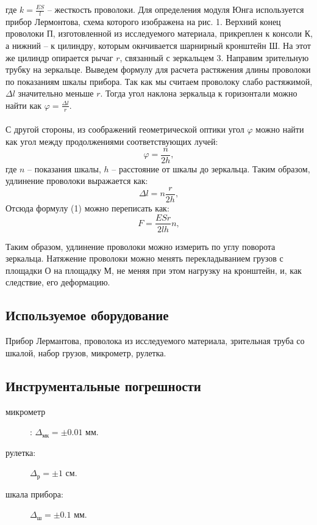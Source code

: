 \documentclass[a4paper]{article}
\begin{document}
\noindent где $k = \frac{ES}{l}$ – жесткость проволоки. Для определения модуля Юнга используется прибор Лермонтова, схема которого изображена на рис. 1. Верхний конец проволоки П, изготовленной из исследуемого материала, прикреплен к консоли К, а нижний – к цилиндру, которым окнчивается шарнирный кронштейн Ш. На этот же цилиндр опирается рычаг $r$, связанный с зеркальцем 3. Направим зрительную трубку на зеркальце. Выведем формулу для расчета растяжения длины проволоки по показаниям шкалы прибора. Так как мы считаем проволоку слабо растяжимой, $\Delta l$ значительно меньше $r$. Тогда угол наклона зеркальца к горизонтали можно найти как $\varphi = \frac{\Delta l}{r}$. \\ \\
С другой стороны, из соображений геометрической оптики угол $\varphi$ можно найти как угол между продолжениями соответствующих лучей:
\begin{equation}
\varphi = \frac{n}{2h},
\end{equation}
где $n$ – показания шкалы, $h$ – расстояние от шкалы до зеркальца.
Таким образом, удлинение проволоки выражается  как:
\begin{equation}
\Delta l = n\frac{r}{2h},
\end{equation}
Отсюда формулу (1) можно переписать как:
\begin{equation}
F = \frac{ESr}{2lh}n,
\end{equation}

\noindent Таким образом, удлинение проволоки можно измерить по углу поворота зеркальца. Натяжение проволоки можно менять перекладыванием грузов с площадки О на площадку М, не меняя при этом нагрузку на кронштейн, и, как следствие, его деформацию. 

\subsection{Используемое оборудование}
Прибор Лермантова, проволока из исследуемого материала, зрительная труба со шкалой, набор грузов, микрометр, рулетка.

\subsection{Инструментальные погрешности}

\begin{description}
    \item[микрометр]: $\Delta_\text{мк} = \pm 0.01$ мм.
    \item[рулетка:] $\Delta_\text{р}=\pm1$ см.
    \item[шкала прибора:] $\Delta_\text{ш}=\pm0.1$ мм.
\end{description}
\newpage
\end{document}

